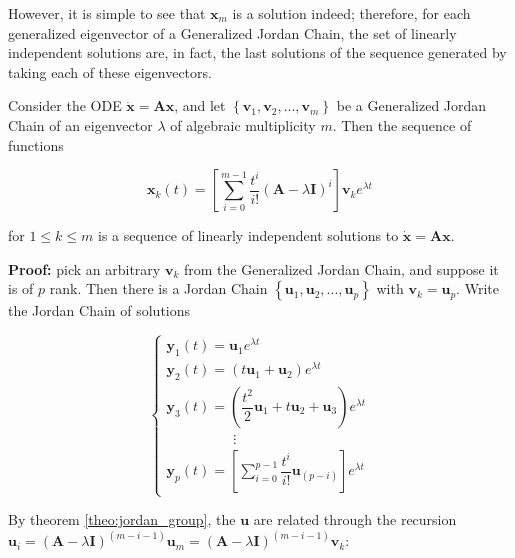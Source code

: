 	However, it is simple to see that $\mathbf{x}_m$ is a solution indeed; therefore, for each generalized eigenvector of a Generalized Jordan Chain, the set of linearly independent solutions are, in fact, the last solutions of the sequence generated by taking each of these eigenvectors.

\begin{theorem} \label{theo:jordan_chain_li_solutions_3} %
	Consider the ODE $\dot{\mathbf{x}} = \mathbf{Ax}$, and let $\left\{\mathbf{v}_1,\mathbf{v}_2,...,\mathbf{v}_m\right\}$ be a Generalized Jordan Chain of an eigenvector $\lambda$ of algebraic multiplicity $m$. Then the sequence of functions 

\begin{equation} \mathbf{x}_k(t) =  \left[\displaystyle\sum\limits_{i=0}^{m-1} \dfrac{t^i}{i!}\left(\mathbf{A} - \lambda\mathbf{I}\right)^{i}\right] \mathbf{v}_ke^{\lambda t} \end{equation}

	for $1\leq k\leq m$ is a sequence of linearly independent solutions to $\dot{\mathbf{x}} = \mathbf{Ax}$.
\end{theorem}
\textbf{Proof:} pick an arbitrary $\mathbf{v}_k$ from the Generalized Jordan Chain, and suppose it is of $p$ rank. Then there is a Jordan Chain $\left\{\mathbf{u}_1,\mathbf{u}_2,...,\mathbf{u}_p\right\}$ with $\mathbf{v}_k = \mathbf{u}_p$. Write the Jordan Chain of solutions

\begin{equation}
\left\{\begin{array}{l}
	\mathbf{y}_1(t) = \mathbf{u}_1 e^{\lambda t} \\[3mm]
	\mathbf{y}_2(t) = \left(t\mathbf{u}_1 + \mathbf{u}_2\right) e^{\lambda t} \\[3mm]
	\mathbf{y}_3(t) = \left(\dfrac{t^2}{2}\mathbf{u}_1 + t\mathbf{u}_2 + \mathbf{u}_3\right) e^{\lambda t} \\[3mm]
	\hspace{2cm} \vdots \\[3mm]
	\mathbf{y}_p(t) = \left[\displaystyle\sum\limits_{i=0}^{p-1} \dfrac{t^i}{i!}\mathbf{u}_{(p-i)} \right] e^{\lambda t}
\end{array}\right.
\end{equation}

	By theorem \ref{theo:jordan_group}, the $\mathbf{u}$ are related through the recursion $\mathbf{u}_i = \left(\mathbf{A} - \lambda\mathbf{I}\right)^{(m-i-1)}\mathbf{u}_m = \left(\mathbf{A} - \lambda\mathbf{I}\right)^{(m-i-1)}\mathbf{v}_k$:


